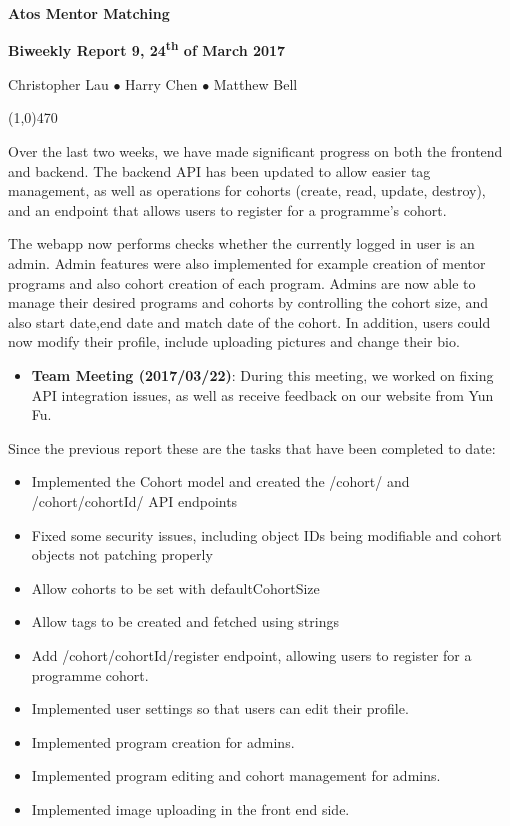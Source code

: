 \documentclass[11pt]{report}
\begin{document}
\centerline{{\LARGE \bf Atos Mentor Matching}}

\centerline{\large \bf Biweekly Report 9, 24\textsuperscript{th} of March 2017}
\centerline{Christopher Lau $\bullet$ Harry Chen $\bullet$ Matthew Bell }
\noindent
\line(1,0){470}\\


\smallskip

\noindent
Over the last two weeks, we have made significant progress on both the frontend
and backend. The backend API has been updated to allow easier tag management, as
well as operations for cohorts (create, read, update, destroy), and an endpoint
that allows users to register for a programme’s cohort.

The webapp now performs checks whether the currently logged in user is an admin.
Admin features were also implemented for example creation of mentor programs and
also cohort creation of each program. Admins are now able to manage their
desired programs and cohorts by controlling the cohort size, and also start
date,end date and match date of the cohort. In addition, users could now modify
their profile, include uploading pictures and change their bio.

\bigskip
{}
\smallskip

\noindent
\begin{itemize}
    \item \textbf{Team Meeting (2017/03/22)}: During this meeting, we worked on
        fixing API integration issues, as well as receive feedback on our
        website from Yun Fu.
\end{itemize}

\bigskip
{}
\smallskip

\noindent
Since the previous report these are the tasks that have been completed to date:
\begin{itemize}
    \item Implemented the Cohort model and created the /cohort/ and
        /cohort/{cohortId}/ API endpoints
    \item Fixed some security issues, including object IDs being modifiable and
        cohort objects not patching properly
    \item Allow cohorts to be set with defaultCohortSize
    \item Allow tags to be created and fetched using strings
    \item Add /cohort/{cohortId}/register endpoint, allowing users to register
        for a programme cohort.
    \item Implemented user settings so that users can edit their profile.
    \item Implemented program creation for admins.
    \item Implemented program editing and cohort management for admins.
    \item Implemented image uploading in the front end side.
\end{itemize}
\end{document}
